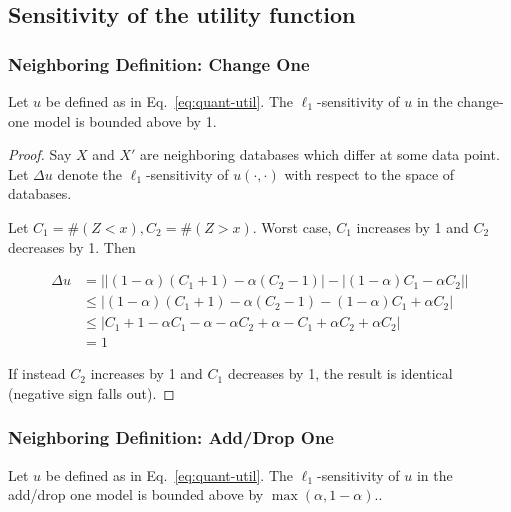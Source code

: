 \documentclass[11pt]{scrartcl} %
\begin{document}
\subsection{Sensitivity of the utility function}

\subsubsection{Neighboring Definition: Change One}

\begin{theorem}
Let $u$ be defined as in Eq.~\ref{eq:quant-util}. The $\ell_1$-sensitivity of $u$ in the change-one model is bounded above by 1. 
\end{theorem}

\begin{proof}
Say $X$ and $X'$ are neighboring databases which differ at some data point. Let $\Delta u$ denote the $\ell_1$-sensitivity of $u(\cdot, \cdot)$ with respect to the space of databases. 

Let $C_1 = \#(Z<x), C_2 = \#(Z>x)$. Worst case, $C_1$ increases by 1 and $C_2$ decreases by 1.
Then 

\begin{align*}
\Delta u &= \left\vert \left\vert (1-\alpha) (C_1 + 1) - \alpha (C_2-1) \right\vert - \left\vert (1-\alpha) C_1 - \alpha C_2 \right\vert \right\vert \\
 &\le \left\vert (1-\alpha) (C_1 + 1) - \alpha (C_2-1) - (1-\alpha) C_1 + \alpha C_2 \right\vert  \\
 &\le \left\vert C_1 + 1 - \alpha C_1 - \alpha - \alpha C_2 + \alpha - C_1 + \alpha C_2 + \alpha C_2 \right\vert  \\
 &= 1
\end{align*}

If instead $C_2$ increases by 1 and $C_1$ decreases by 1, the result is identical (negative sign falls out).

\end{proof}

\subsubsection{Neighboring Definition: Add/Drop One}

\begin{theorem}
Let $u$ be defined as in Eq.~\ref{eq:quant-util}. The $\ell_1$-sensitivity of $u$ in the add/drop one model is bounded above by $\max(\alpha, 1-\alpha)$.. 
\end{theorem}
\end{document}
